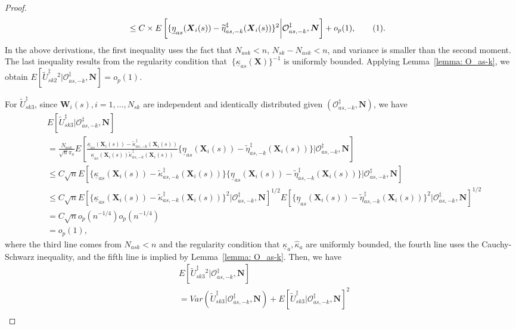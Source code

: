 \documentclass[12pt]{article}
\newcommand{\bX}{\boldsymbol{X}}
\newcommand{\bW}{\boldsymbol{W}}
\newcommand{\bN}{\boldsymbol{N}}
\newcommand\numberthis{\addtocounter{equation}{1}\tag{\theequation}}
\begin{document}
\begin{proof}
\begin{align*}
    &\le C\times E\left[\{\underline{\eta}_{as}(\bX_i(s))-\widetilde{\eta}_{as,-k}^\ddagger(\bX_i(s))\}^2\bigg|\mathcal{O}_{as,-k}^\ddagger,\bN\right] + o_p(1),\numberthis\label{Eq: eta-convergence-s}.
\end{align*}
In the above derivations, the first inequality uses the fact that $N_{ask} < n$, $N_{sk}-N_{ask} < n$, and variance is smaller than the second moment. The last inequality results from the regularity condition that $\ \{\underline{\kappa}_{as}(\bX)\}^{-1}$ is uniformly bounded. Applying Lemma~\ref{lemma: O_as-k}, we obtain $ E[\widetilde{U}_{sk2}^\ddagger{}^2|\mathcal{O}_{as,-k}^\ddagger,\bN] = o_p(1)$.

For $\widetilde{U}_{sk3}^\ddagger$,  since $\bW_i(s), i=1,\dots, N_{sk}$ are independent and identically distributed given $(\mathcal{O}_{as,-k}^\ddagger,\bN)$, we have
\begin{align*}
    & E[\widetilde{U}_{sk3}^\ddagger|\mathcal{O}_{as,-k}^\ddagger,\bN] \\
    &= \frac{N_{ask}}{\sqrt{n}\pi_a} E\left[\frac{\underline{\kappa}_{as}(\bX_i(s)) - \widetilde{\kappa}^\ddagger_{as,-k}(\bX_i(s))}{\underline{\kappa}_{as}(\bX_i(s))\widetilde{\kappa}^\ddagger_{as,-k}(\bX_i(s))}\{\underline{\eta}_{as}(\bX_i(s))-\widetilde{\eta}_{as,-k}^\ddagger(\bX_i(s))\}\bigg|\mathcal{O}_{as,-k}^\ddagger,\bN\right]\\
    &\le C \sqrt{n} E\left[\{\underline{\kappa}_{as}(\bX_i(s)) - \widetilde{\kappa}^\ddagger_{as,-k}(\bX_i(s))\}\{\underline{\eta}_{as}(\bX_i(s))-\widetilde{\eta}_{as,-k}^\ddagger(\bX_i(s))\}\bigg|\mathcal{O}_{as,-k}^\ddagger,\bN\right] \\
    &\le C \sqrt{n} E\left[\{\underline{\kappa}_{as}(\bX_i(s)) - \widetilde{\kappa}^\ddagger_{as,-k}(\bX_i(s))\}^2\bigg|\mathcal{O}_{as,-k}^\ddagger,\bN\right]^{1/2}E\left[\{\underline{\eta}_{as}(\bX_i(s))-\widetilde{\eta}_{as,-k}^\ddagger(\bX_i(s))\}^2\bigg|\mathcal{O}_{as,-k}^\ddagger,\bN\right]^{1/2} \\
    &= C \sqrt{n} o_p(n^{-1/4})o_p(n^{-1/4}) \\
    &= o_p(1),
\end{align*}
where the third line comes from $N_{ask} < n$ and the regularity condition that $\underline{\kappa}_a, \widehat{\kappa}_a$ are uniformly bounded, the fourth line uses the Cauchy-Schwarz inequality, and the fifth line is implied by Lemma~\ref{lemma: O_as-k}. Then, we have
\begin{align*}
    & E[\widetilde{U}_{sk3}^\ddagger{}^2|\mathcal{O}_{as,-k}^\ddagger,\bN]\\ &= Var(\widetilde{U}_{sk3}^\ddagger|\mathcal{O}_{as,-k}^\ddagger,\bN) + E[\widetilde{U}_{sk3}^\ddagger|\mathcal{O}_{as,-k}^\ddagger,\bN]^2 \\

\end{align*}
\end{proof}
\end{document}
